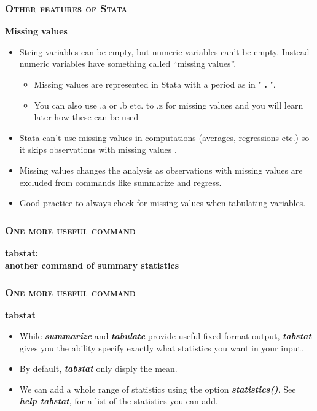 \documentclass[10pt]{beamer}
\begin{document}
	
	\begin{frame}
	\frametitle{\textsc{Other features of Stata}}
		\begin{center}
			\LARGE 	\textbf{Missing values}
		\end{center}
		\begin{itemize}
			\item String variables can be empty, but numeric variables can't be empty. 
				  Instead numeric variables have something called “missing values”.
				\begin{itemize}
					\item Missing values are represented in Stata with a period as in " \textbf{.} ". 
					\item You can also use .a or .b etc. to .z for missing values 
						  and you will learn later how these can be used
				\end{itemize}
			\item Stata can't use missing values in computations (averages, regressions etc.) 
				  so it skips observations with missing values . 
			\item Missing values changes the analysis as observations with 
				  missing values are excluded from commands like summarize and regress.
			\item Good practice to always check for missing values when tabulating variables.			
		\end{itemize}
	\end{frame}
	
	\begin{frame}
	\frametitle{\textsc{One more useful command}}
		\begin{center}
		\Large \textbf{tabstat: \\ another command of summary statistics}
		\end{center}
	\end{frame}
		
	\begin{frame}
	\frametitle{\textsc{One more useful command}}
		\begin{center}
			\LARGE \textbf{tabstat}
		\end{center}
		\begin{itemize}
			\item While \textbf{\textit{summarize}} and \textbf{\textit{tabulate}} 
				  provide useful fixed format output, 
				  \textbf{\textit{tabstat}} gives you the ability specify 
				  exactly what statistics you want in your input.
			\item By default, \textbf{\textit{tabstat}} only disply the mean.
			\item We can add a whole range of statistics using the option 
				  \textbf{\textit{statistics()}}. 
				  See \textbf{\textit{help tabstat}}, for a list of the statistics you can add.
		\end{itemize}
	\end{frame}
	
\end{document}

